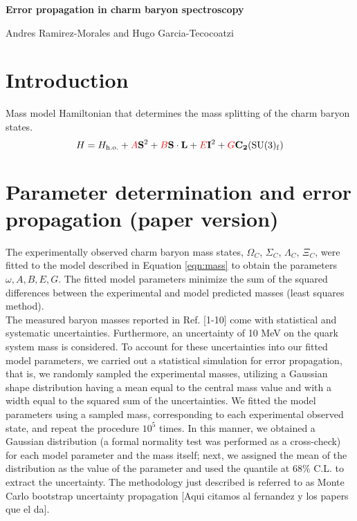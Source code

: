 \documentclass{article}
\begin{document}
\centerline{\LARGE{\textbf{Error propagation in charm baryon spectroscopy}}}
\smallskip
\centerline{Andres Ramirez-Morales and Hugo Garcia-Tecocoatzi}

\section*{Introduction}

Mass model Hamiltonian that determines the mass splitting of the charm baryon states.
\begin{equation}
\label{eqn:mass}
H = H_{\mathrm{h.o.}} + \textcolor{red}{A}\mathbf{S}^{2} + \textcolor{red}{B}\mathbf{S\cdot L} +  \textcolor{red}{E}\mathbf{I}^{2} + \textcolor{red}{G}\mathbf{C_{2}}(\mathrm{SU(3)_{f}})
\end{equation}

\section*{Parameter determination and error propagation (paper version)}

The experimentally observed charm baryon mass states, $\Omega_{C}$,  $\Sigma_{C}$, $\Lambda_{C}$, $\Xi_{C}$, were fitted to the model described in Equation \ref{eqn:mass} to obtain the parameters $\omega, A, B, E, G$. The fitted model parameters minimize the sum of the squared differences between the experimental and model predicted masses (least squares method).\\

The measured baryon masses  reported in Ref. [1-10] come with statistical and systematic uncertainties.  Furthermore, an uncertainty of 10 MeV on the quark system mass is considered.  To account for these uncertainties into our fitted model parameters, we carried out a statistical simulation for error propagation, that is, we randomly sampled the experimental masses, utilizing a Gaussian shape distribution having a mean equal to the central mass value and with a width equal to the squared sum of the uncertainties. We fitted the model parameters using a sampled mass, corresponding to each experimental observed state, and repeat the procedure $10^5$ times. In this manner, we obtained a Gaussian distribution (a formal normality test was performed as a cross-check) for each model parameter and the mass itself; next, we assigned the mean of the distribution as the value of the parameter and used the quantile at 68\% C.L. to extract the uncertainty. The methodology just described is referred to as Monte Carlo bootstrap uncertainty propagation [Aqui citamos al fernandez y los papers que el da].\\
\end{document}
